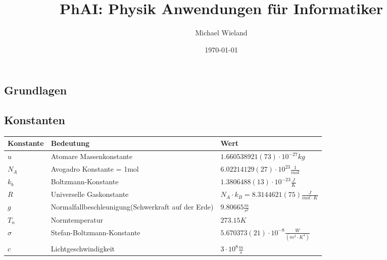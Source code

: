 \documentclass[
a4paper,
oneside,
landscape, 
8pt,
]{scrartcl}
\title{PhAI: Physik Anwendungen für Informatiker}
\author{Michael Wieland}
\date{\today}
\begin{document}
\maketitle



\begin{multicols*}{2}
	
\tableofcontents
\clearpage
	
\section{Grundlagen}
\subsection{Konstanten}
\begin{tabbing}
	\begin{tabu} to \linewidth {l X l }
		\toprule
		Konstante & Bedeutung & Wert \\
		\midrule
		$u$ & Atomare Massenkonstante & $1.660538921(73) \cdot 10^{-27} kg$\\
		$N_A$ & Avogadro Konstante = 1mol & $6.022141 29 (27) \cdot 10^{23} \frac{1}{mol}$  \\
		$k_b$ & Boltzmann-Konstante & $1.3806488(13) \cdot 10^{-23}\frac{J}{K}$  \\
		$R$ & Universelle Gaskonstante & $N_A \cdot k_B = 8.3144621 (75) \frac{J}{mol \cdot K}$ \\
		$g$ & Normalfallbeschleunigung(Schwerkraft auf der Erde) & $9.80665\frac{m}{s^2}$ \\
		$T_n$ & Normtemperatur & $273.15K$  \\
		$\sigma$ & Stefan-Boltzmann-Konstante & $5.670373(21) \cdot 10^{-8} \frac{W}{(m^2 \cdot K^4)}$  \\
		$c$ & Lichtgeschwindigkeit & $3 \cdot 10^8 \frac{m}{s}$  \\
	\end{tabu}
\end{tabbing}


\end{multicols*}
\end{document}
